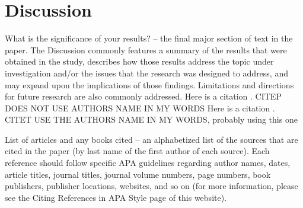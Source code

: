 \documentclass[12pt]{article}
\begin{document}
\section*{Discussion}
What is the significance of your results? – the final major section of text in the paper.  The Discussion commonly features a summary of the results that were obtained in the study, describes how those results address the topic under investigation and/or the issues that the research was designed to address, and may expand upon the implications of those findings.  Limitations and directions for future research are also commonly addressed.
Here is a citation \citep{Babu}. CITEP DOES NOT USE AUTHORS NAME IN MY WORDS
Here is a citation \citet{Baramidze}. CITET USE THE AUTHORS NAME IN MY WORDS, probably using this one




List of articles and any books cited – an alphabetized list of the sources that are cited in the paper (by last name of the first author of each source).  Each reference should follow specific APA guidelines regarding author names, dates, article titles, journal titles, journal volume numbers, page numbers, book publishers, publisher locations, websites, and so on (for more information, please see the Citing References in APA Style page of this website).
\end{document}
